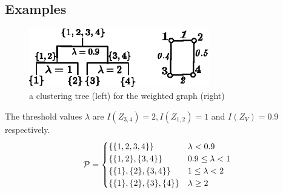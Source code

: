 \documentclass[notheorems]{beamer}
\begin{document}
\subsection{Examples}
\begin{frame}
\begin{figure}
\centering
\includegraphics[width=0.7\textwidth]{pic/threshold.eps}
\caption{a clustering tree (left) for the weighted graph (right)}
\end{figure}

The threshold values $\lambda$ are $I(Z_{3,4})=2, I(Z_{1,2})=1$ and $I(Z_V)=0.9$ respectively.
\begin{equation*}
\P = 
\begin{cases}
\{\{1,2,3,4\}\} & \lambda < 0.9 \\
\{\{1,2\},\{3,4\}\} & 0.9 \leq \lambda < 1 \\
\{\{1\},\{2\},\{3,4\}\} & 1 \leq \lambda < 2\\
\{\{1\},\{2\},\{3\},\{4\}\} & \lambda \geq 2
\end{cases}
\end{equation*}
\end{frame}
\end{document}
